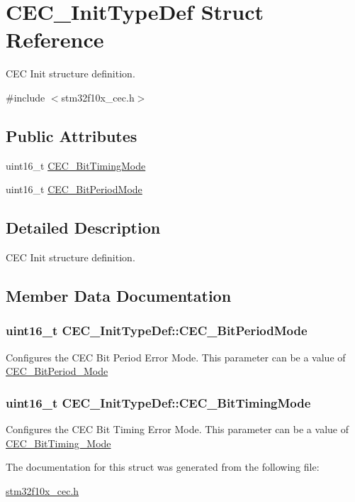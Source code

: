 \hypertarget{structCEC__InitTypeDef}{
\section{CEC\_\-InitTypeDef Struct Reference}
\label{structCEC__InitTypeDef}
}


CEC Init structure definition.  




{\ttfamily \#include $<$stm32f10x\_\-cec.h$>$}

\subsection*{Public Attributes}
\begin{DoxyCompactItemize}
\item 
uint16\_\-t \hyperlink{structCEC__InitTypeDef_a197bc5a8957ab0b86d4ecc1347fa9e37}{CEC\_\-BitTimingMode}
\item 
uint16\_\-t \hyperlink{structCEC__InitTypeDef_a3cc27a2030d87a8bea17c6b0750dda2a}{CEC\_\-BitPeriodMode}
\end{DoxyCompactItemize}


\subsection{Detailed Description}
CEC Init structure definition. 

\subsection{Member Data Documentation}
\hypertarget{structCEC__InitTypeDef_a3cc27a2030d87a8bea17c6b0750dda2a}{
\subsubsection[{CEC\_\-BitPeriodMode}]{\setlength{\rightskip}{0pt plus 5cm}uint16\_\-t {\bf CEC\_\-InitTypeDef::CEC\_\-BitPeriodMode}}}
\label{structCEC__InitTypeDef_a3cc27a2030d87a8bea17c6b0750dda2a}
Configures the CEC Bit Period Error Mode. This parameter can be a value of \hyperlink{group__CEC__BitPeriod__Mode}{CEC\_\-BitPeriod\_\-Mode} \hypertarget{structCEC__InitTypeDef_a197bc5a8957ab0b86d4ecc1347fa9e37}{
\subsubsection[{CEC\_\-BitTimingMode}]{\setlength{\rightskip}{0pt plus 5cm}uint16\_\-t {\bf CEC\_\-InitTypeDef::CEC\_\-BitTimingMode}}}
\label{structCEC__InitTypeDef_a197bc5a8957ab0b86d4ecc1347fa9e37}
Configures the CEC Bit Timing Error Mode. This parameter can be a value of \hyperlink{group__CEC__BitTiming__Mode}{CEC\_\-BitTiming\_\-Mode} 

The documentation for this struct was generated from the following file:\begin{DoxyCompactItemize}
\item 
\hyperlink{stm32f10x__cec_8h}{stm32f10x\_\-cec.h}\end{DoxyCompactItemize}
